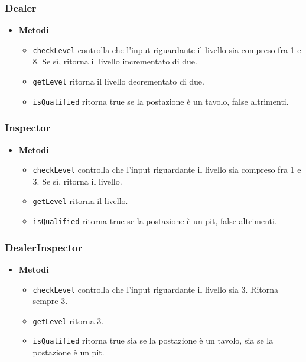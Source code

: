 \subsubsection{Dealer}
\begin{itemize}
    \item \textbf{Metodi}
    \begin{itemize}
        \item \texttt{checkLevel} controlla che l'input riguardante il livello sia compreso fra 1 e 8. Se sì, ritorna il livello incrementato di due.
        \item \texttt{getLevel} ritorna il livello decrementato di due.
        \item \texttt{isQualified} ritorna true se la postazione è un tavolo, false altrimenti.
    \end{itemize}
\end{itemize}

\subsubsection{Inspector}
\begin{itemize}
    \item \textbf{Metodi}
    \begin{itemize}
        \item \texttt{checkLevel} controlla che l'input riguardante il livello sia compreso fra 1 e 3. Se sì, ritorna il livello.
        \item \texttt{getLevel} ritorna il livello.
        \item \texttt{isQualified} ritorna true se la postazione è un pit, false altrimenti.
    \end{itemize}
\end{itemize}
\subsubsection{DealerInspector}
\begin{itemize}
    \item \textbf{Metodi}
    \begin{itemize}
        \item \texttt{checkLevel} controlla che l'input riguardante il livello sia 3. Ritorna sempre 3.
        \item \texttt{getLevel} ritorna 3.
        \item \texttt{isQualified} ritorna true sia se la postazione è un tavolo, sia se la postazione è un pit.
    \end{itemize}
\end{itemize}
